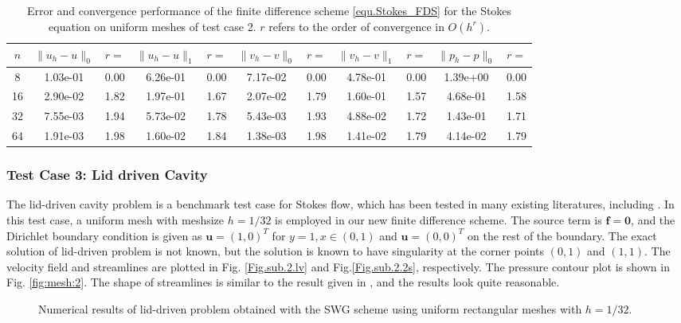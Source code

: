 \documentclass[final,leqno]{siamltex704}
\begin{document}
\begin{table}[h]
\begin{center}
\caption{Error and convergence performance of the finite difference scheme \eqref{equ.Stokes_FDS} for the Stokes equation on uniform meshes of test case 2. $r$ refers to the order of convergence in $O(h^r).$ }\label{table5}
{\tiny
\begin{tabular}{||c|cc|cc|cc|cc|cc||}
\hline
$n$ & $\|u_h-u \|_{0}$ & $r=$ & $\|u_h-u\|_{1}$ & $r=$ &$\|v_h-v \|_{0}$& $r=$ &$\|v_h-v\|_{1}$ & $r=$ &$\|p_h-p \|_{0}$& $r=$ \\
\hline
8   &  1.03e-01  & 0.00   &  6.26e-01  & 0.00  &   7.17e-02  & 0.00  &   4.78e-01 &  0.00  &   1.39e+00  & 0.00\\
16  &  2.90e-02  & 1.82   &  1.97e-01  & 1.67  &   2.07e-02  & 1.79  &   1.60e-01 &  1.57  &   4.68e-01  & 1.58\\
32  &  7.55e-03  & 1.94   &  5.73e-02  & 1.78  &   5.43e-03  & 1.93  &   4.88e-02 &  1.72  &   1.43e-01  & 1.71\\
64  &  1.91e-03  & 1.98   &  1.60e-02  & 1.84  &   1.38e-03  & 1.98  &   1.41e-02 &  1.79  &   4.14e-02  & 1.79\\
\hline
\end{tabular} }
\end{center}
\end{table}

\subsubsection{Test Case 3: Lid driven Cavity}
The lid-driven cavity problem is a benchmark test case for Stokes flow, which has been tested in many existing literatures, including \cite{LTF-IJNMF-1995,LIU-SIAM-NA-2011,WWY-SIAM-JSC-2009,RXZZ-JCAM-2016}.
In this test case, a uniform mesh with meshsize $h=1/32$ is employed in our new finite difference scheme.
The source term is $\bm{f} =\bm{0}$, and the Dirichlet boundary condition is given as $\bm{u} = (1,0)^{T}$ for $y=1, x\in(0,1)$ and $\bm{u} = (0,0)^{T}$ on the rest of the boundary.
The exact solution of lid-driven problem is not known, but the solution is known to have singularity at the corner points $(0,1)$ and $(1,1)$.
The velocity field and streamlines are plotted in Fig. \ref{Fig.sub.2.lv} and Fig.\ref{Fig.sub.2.2s}, respectively. The pressure contour plot is shown in Fig. \ref{fig:mesh:2}. The shape of streamlines is similar to the result given in \cite{LTF-IJNMF-1995,LIU-SIAM-NA-2011,WWY-SIAM-JSC-2009,RXZZ-JCAM-2016}, and the results look quite reasonable.
\begin{figure}[H]
\centering
{}
\caption{Numerical results of lid-driven problem obtained with the SWG scheme using uniform rectangular meshes with $h=1/32$.}
\label{fig:mesh}
\end{figure}
\end{document}
